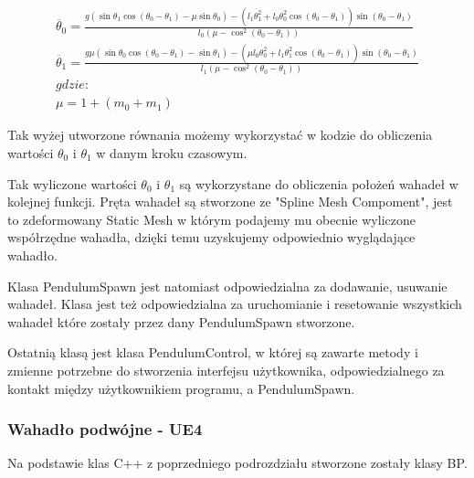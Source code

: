 \documentclass[a4paper,12pt,reqno]{article}
\begin{document}
\begin{equation}
\begin{split} 
\ddot{\theta_0}=\frac{g(\sin\theta_1\cos(\theta_0-\theta_1)-\mu\sin\theta_0)
-(l_1\dot{\theta_1^2}+l_0\dot{\theta_0^2}\cos(\theta_0-\theta_1))\sin(\theta_0-\theta_1)}{l_0(\mu-\cos^2(\theta_0-\theta_1))}
\\
\ddot{\theta_1}=\frac{g\mu(\sin\theta_0\cos(\theta_0-\theta_1)-\sin\theta_1)
-(\mu l_0\dot{\theta_0^2}+l_1\dot{\theta_1^2}\cos(\theta_0-\theta_1))\sin(\theta_0-\theta_1)}
{l_1(\mu-\cos^2(\theta_0-\theta_1))}
\\
gdzie:
\\
\mu=1+(m_0+m_1)
\end{split}
\label{computeAngularAcceleration}
\end{equation}

Tak wyżej utworzone równania możemy wykorzystać w kodzie do obliczenia wartości $\theta_0$ i $\theta_1$ w danym kroku czasowym.


\label{ComputeTheta}


Tak wyliczone wartości $\theta_0$ i $\theta_1$ są wykorzystane do obliczenia położeń wahadeł w kolejnej funkcji. Pręta wahadeł są stworzone ze "Spline Mesh Compoment", jest to zdeformowany Static Mesh w którym podajemy mu obecnie wyliczone współrzędne wahadła, dzięki temu uzyskujemy odpowiednio wyglądające wahadło.




Klasa PendulumSpawn jest natomiast odpowiedzialna za dodawanie, usuwanie wahadeł. Klasa jest też odpowiedzialna za uruchomianie i resetowanie wszystkich wahadeł które zostały przez dany PendulumSpawn stworzone.

Ostatnią klasą jest klasa PendulumControl, w której są zawarte metody i zmienne potrzebne do stworzenia interfejsu użytkownika, odpowiedzialnego za kontakt między użytkownikiem programu, a PendulumSpawn.

\subsubsection{Wahadło podwójne - UE4}

Na podstawie klas C++ z poprzedniego podrozdziału stworzone zostały klasy BP.
\end{document}
